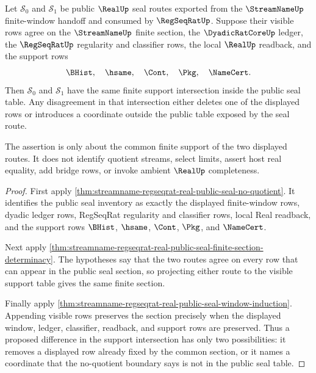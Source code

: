 \begin{theorem}
\label{thm:streamname-regseqrat-real-public-seal-support-intersection}
Let $\mathcal S_0$ and $\mathcal S_1$ be public $\RealUp$ seal routes exported
from the $\StreamNameUp$ finite-window handoff and consumed by $\RegSeqRatUp$.
Suppose their visible rows agree on the $\StreamNameUp$ finite section, the
$\DyadicRatCoreUp$ ledger, the $\RegSeqRatUp$ regularity and classifier rows,
the local $\RealUp$ readback, and the support rows
$$
\BHist,\quad \hsame,\quad \Cont,\quad \Pkg,\quad \NameCert.
$$
Then $\mathcal S_0$ and $\mathcal S_1$ have the same finite support
intersection inside the public seal table. Any disagreement in that
intersection either deletes one of the displayed rows or introduces a
coordinate outside the public table exposed by the seal route.

The assertion is only about the common finite support of the two displayed
routes. It does not identify quotient streams, select limits, assert host real
equality, add bridge rows, or invoke ambient $\RealUp$ completeness.
\end{theorem}
\begin{proof}
First apply
\autoref{thm:streamname-regseqrat-real-public-seal-no-quotient}. It identifies
the public seal inventory as exactly the displayed finite-window rows, dyadic
ledger rows, RegSeqRat regularity and classifier rows, local Real readback, and
the support rows $\BHist$, $\hsame$, $\Cont$, $\Pkg$, and $\NameCert$.

Next apply
\autoref{thm:streamname-regseqrat-real-public-seal-finite-section-determinacy}.
The hypotheses say that the two routes agree on every row that can appear in
the public seal section, so projecting either route to the visible support table
gives the same finite section.

Finally apply
\autoref{thm:streamname-regseqrat-real-public-seal-window-induction}. Appending
visible rows preserves the section precisely when the displayed window, ledger,
classifier, readback, and support rows are preserved. Thus a proposed
difference in the support intersection has only two possibilities: it removes a
displayed row already fixed by the common section, or it names a coordinate that
the no-quotient boundary says is not in the public seal table.
\end{proof}

